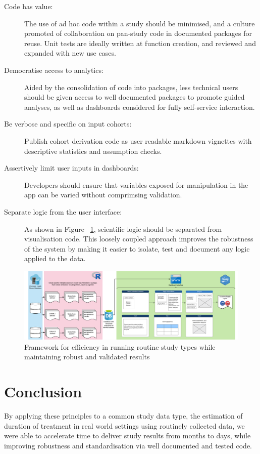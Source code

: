 \documentclass{amia}
\begin{document}
\begin{description}
  \item[Code has value:] The use of ad hoc code within a study should be minimised, and a culture promoted of collaboration on pan-study code in documented packages for reuse. Unit tests are ideally written at function creation, and reviewed and expanded with new use cases.
  \item[Democratise access to analytics:] Aided by the consolidation of code into packages, less technical users should be given access to well documented packages to promote guided analyses, as well as dashboards considered for fully self-service interaction.
  \item[Be verbose and specific on input cohorts:] Publish cohort derivation code as user readable markdown vignettes with descriptive statistics and assumption checks.
  \item[Assertively limit user inputs in dashboards:] Developers should ensure that variables exposed for manipulation in the app can be varied without comprimsing validation.
  \item[Separate logic from the user interface:] As shown in Figure ~\ref{fig1}, scientific logic should be separated from visualisation code. This loosely coupled approach improves the robustness of the system by making it easier to isolate, test and document any logic applied to the data.
\end{description}


\begin{figure}[h!]
\centering
\includegraphics[width=\textwidth]{pics/abstract_image.png}
\caption{Framework for efficiency in running routine study types while maintaining robust and validated results}
\label{fig1}
\end{figure}

\section*{Conclusion}
By applying these principles to a common study data type, the estimation of duration of treatment in real world settings using routinely collected data, we were able to accelerate time to deliver study results from months to days, while improving robustness and standardisation via well documented and tested code.
\end{document}
